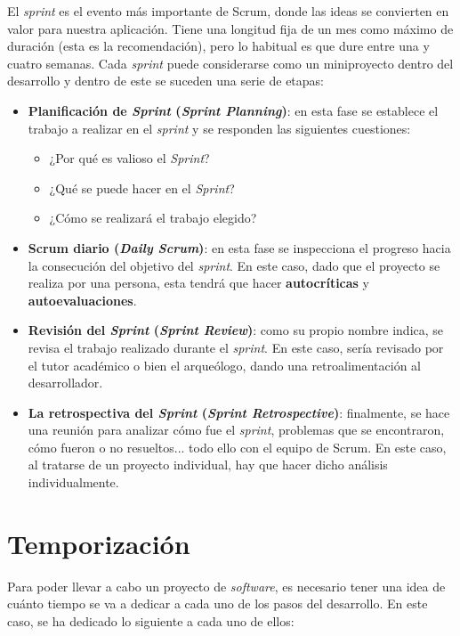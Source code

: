 El \textit{sprint} es el evento más importante de Scrum, donde las ideas se convierten en
valor para nuestra aplicación. Tiene una longitud fija de un mes como máximo de duración
(esta es la recomendación), pero lo habitual es que dure entre una y cuatro semanas. Cada
\textit{sprint} puede considerarse como un miniproyecto dentro del desarrollo y dentro de
este se suceden una serie de etapas:

    \begin{itemize}
        \item \textbf{Planificación de \textit{Sprint} (\textit{Sprint Planning})}: en esta fase se establece
        el trabajo a realizar en el \textit{sprint} y se responden las siguientes cuestiones:
            \begin{itemize}
                \item ¿Por qué es valioso el \textit{Sprint}?
                \item ¿Qué se puede hacer en el \textit{Sprint}?
                \item ¿Cómo se realizará el trabajo elegido?
            \end{itemize}
        \item \textbf{Scrum diario (\textit{Daily Scrum})}: en esta fase se inspecciona el progreso
        hacia la consecución del objetivo del \textit{sprint}. En este caso, dado que el
        proyecto se realiza por una persona, esta tendrá que hacer \textbf{autocríticas} y
        \textbf{autoevaluaciones}.
        \item \textbf{Revisión del \textit{Sprint} (\textit{Sprint Review})}: como su propio nombre indica,
        se revisa el trabajo realizado durante el \textit{sprint}. En este caso, sería
        revisado por el tutor académico o bien el arqueólogo, dando una retroalimentación al
        desarrollador.
        \item \textbf{La retrospectiva del \textit{Sprint} (\textit{Sprint Retrospective})}: finalmente, se
        hace una reunión para analizar cómo fue el \textit{sprint}, problemas que se encontraron,
        cómo fueron o no resueltos... todo ello con el equipo de Scrum. En este caso, al
        tratarse de un proyecto individual, hay que hacer dicho análisis individualmente. 
    \end{itemize}



\section{Temporización} \label{sec:timing}
Para poder llevar a cabo un proyecto de \textit{software}, es necesario tener una idea de cuánto
tiempo se va a dedicar a cada uno de los pasos del desarrollo. En este caso, se ha
dedicado lo siguiente a cada uno de ellos:

